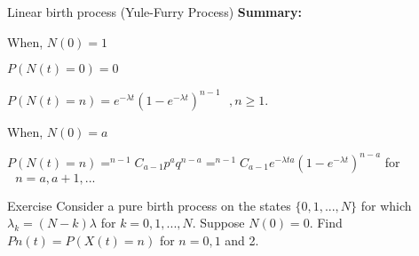 \documentclass[12pt,ignorenonframetext,]{beamer}
\begin{document}
\begin{frame}{Linear birth process (Yule-Furry Process)}
\protect\hypertarget{linear-birth-process-yule-furry-process-2}{}
\textbf{Summary:}

\begin{block}{When, \(N(0) = 1\)}
\protect\hypertarget{when-n0-1}{}
\vspace{0.5cm}

\(P(N(t)=0)=0\)

\(P(N(t)=n)=e^{-\lambda t}(1-e^{-\lambda t})^{n-1}\text{ }, n \geq 1.\)

\vspace{0.5cm}
\end{block}

\begin{block}{When, \(N(0) = a\)}
\protect\hypertarget{when-n0-a}{}
\vspace{0.5cm}

\(P(N(t)=n) = ^{n-1}C_{a-1}p^{a}q^{n-a} = ^{n-1}C_{a-1}e^{-\lambda t a}(1-e^{-\lambda t})^{n-a}\)
for \(\text{   } n = a, a+1, ...\)
\end{block}
\end{frame}

\begin{frame}{Exercise}
\protect\hypertarget{exercise}{}
Consider a pure birth process on the states \(\{0, 1, ..., N\}\) for
which \(\lambda_k = (N-k) \lambda\) for \(k = 0, 1, ..., N\). Suppose
\(N(0) = 0\). Find \(Pn(t) =P(X(t) = n )\) for \(n = 0, 1\) and 2.
\end{frame}
\end{document}
